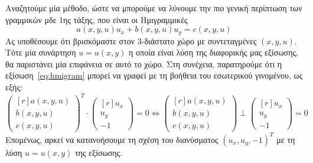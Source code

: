 Αναζητούμε μία μέθοδο, ώστε να μπορούμε να λύνουμε την πιο γενική περίπτωση των 
γραμμικών μδε 1ης τάξης, που είναι οι Ημιγραμμικές
\begin{equation}\label{eq:hmigram}
  a(x,y,u)u_{x}+b(x,y,u)u_{y}=c(x,y,u) 
\end{equation}
Ας υποθέσουμε ότι βρισκόμαστε στον 3-διάστατο χώρο με συντεταγμένες $ (x,y,u) $. 
Τότε μία συνάρτηση $ u=u(x,y) $ η οποία είναι λύση της διαφορικής μας εξίσωσης, θα 
παριστάνει μία επιφάνεια σε αυτό το χώρο. Στη συνέχεια, παρατηρούμε ότι η
εξίσωση~\eqref{eq:hmigram} μπορεί να γραφεί με τη βοήθεια του εσωτερικού γινομένου, ως
εξής:
\begin{equation}\label{eq:perp}
  \begin{pmatrix*}[r] a(x,y,u) \\ b(x,y,u) \\ c(x,y,u) \end{pmatrix*}^{T} \cdot 
  \begin{pmatrix*}[r] u_{x} \\ u_{y} \\ -1 \end{pmatrix*} = 0 \Leftrightarrow 
  \begin{pmatrix*}[r] a(x,y,u) \\ b(x,y,u) \\ c(x,y,u) \end{pmatrix*} \perp 
  \begin{pmatrix*}[r] u_{x} \\ u_{y} \\ -1 \end{pmatrix*} = 0 
\end{equation}
Επομένως, αρκεί να κατανοήσουμε τη σχέση του διανύσματος $ (u_{x},u_{y},-1)^{T} $ 
με τη λύση $ u=u(x,y) $ της εξίσωσης.

